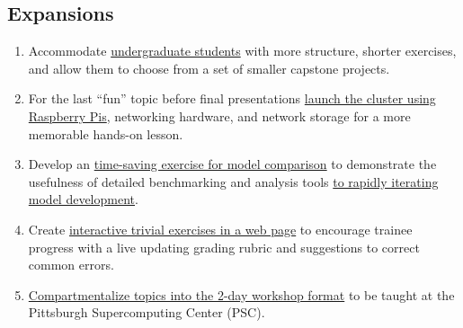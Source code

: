 \documentclass{article}
\newcommand{\sectionbox}[1]{%
  \begin{tcolorbox}[sharp corners,boxrule=0pt,top=15pt,colback=fh-blue,coltext=fh-gold]%
    \section*{#1\vphantom{Yy}}%
  \end{tcolorbox}%
}
\begin{document}
\begin{multicols}{2}

  \sectionbox{Expansions}%
  \begin{multicols}{2}
    \begin{enumerate}
    \item Accommodate \ul{undergraduate students} %
      with more structure, %
      shorter exercises, %
      and allow them to choose from a set of smaller capstone projects.
    \item For the last ``fun'' topic before final presentations %
      \ul{launch the cluster using Raspberry Pis}, %
      networking hardware, and network storage %
      for a more memorable hands-on lesson.
    \item Develop an \ul{time-saving exercise for model comparison} %
      to demonstrate the usefulness %
      of detailed benchmarking and analysis tools %
      \ul{to rapidly iterating model development}.
    \item Create \ul{interactive trivial exercises in a web page} %
      to encourage trainee progress with %
      a live updating grading rubric %
      and suggestions to correct common errors.
    \item \ul{Compartmentalize topics %
      into the 2-day workshop format} %
      to be taught at the Pittsburgh Supercomputing Center (PSC).
    \end{enumerate}
  \end{multicols}


\end{multicols}
\end{document}
